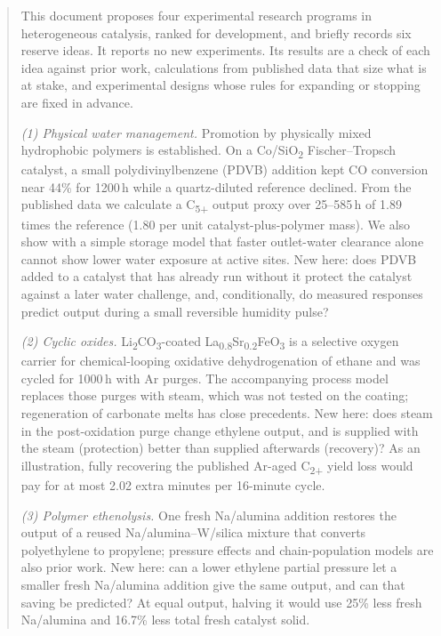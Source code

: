 \begin{abstract}
This document proposes four experimental research programs in heterogeneous catalysis, ranked for development, and briefly records six reserve ideas. It reports no new experiments. Its results are a check of each idea against prior work, calculations from published data that size what is at stake, and experimental designs whose rules for expanding or stopping are fixed in advance.

\emph{(1) Physical water management.} Promotion by physically mixed hydrophobic polymers is established. On a Co/SiO\textsubscript{2} Fischer--Tropsch catalyst, a small polydivinylbenzene (PDVB) addition kept CO conversion near 44\% for 1200\,h while a quartz-diluted reference declined. From the published data we calculate a C\textsubscript{5+} output proxy over 25--585\,h of 1.89 times the reference (1.80 per unit catalyst-plus-polymer mass). We also show with a simple storage model that faster outlet-water clearance alone cannot show lower water exposure at active sites. New here: does PDVB added to a catalyst that has already run without it protect the catalyst against a later water challenge, and, conditionally, do measured responses predict output during a small reversible humidity pulse?

\emph{(2) Cyclic oxides.} Li\textsubscript{2}CO\textsubscript{3}-coated La\textsubscript{0.8}Sr\textsubscript{0.2}FeO\textsubscript{3} is a selective oxygen carrier for chemical-looping oxidative dehydrogenation of ethane and was cycled for 1000\,h with Ar purges. The accompanying process model replaces those purges with steam, which was not tested on the coating; \COtwo{} regeneration of carbonate melts has close precedents. New here: does steam in the post-oxidation purge change ethylene output, and is \COtwo{} supplied with the steam (protection) better than \COtwo{} supplied afterwards (recovery)? As an illustration, fully recovering the published Ar-aged C\textsubscript{2+} yield loss would pay for at most 2.02 extra minutes per 16-minute cycle.

\emph{(3) Polymer ethenolysis.} One fresh Na/alumina addition restores the output of a reused Na/alumina--W/silica mixture that converts polyethylene to propylene; pressure effects and chain-population models are also prior work. New here: can a lower ethylene partial pressure let a smaller fresh Na/alumina addition give the same output, and can that saving be predicted? At equal output, halving it would use 25\% less fresh Na/alumina and 16.7\% less total fresh catalyst solid.


\end{abstract}

